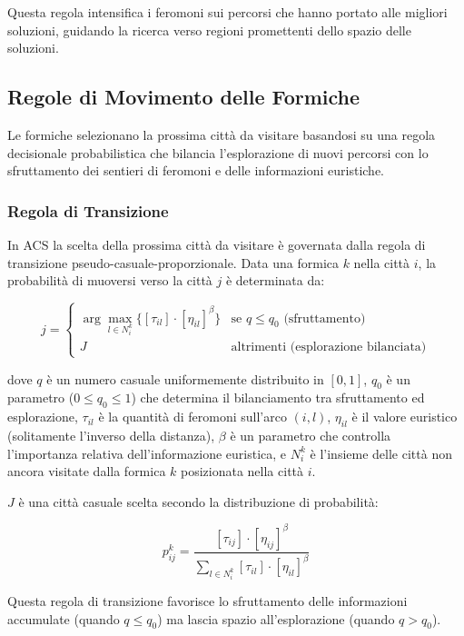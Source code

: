 Questa regola intensifica i feromoni sui percorsi che hanno portato alle migliori soluzioni, guidando la ricerca verso regioni promettenti dello spazio delle soluzioni.

\subsection{Regole di Movimento delle Formiche}

Le formiche selezionano la prossima città da visitare basandosi su una regola decisionale probabilistica che bilancia l'esplorazione di nuovi percorsi con lo sfruttamento dei sentieri di feromoni e delle informazioni euristiche.

\subsubsection{Regola di Transizione}
In \Gls{ACS} la scelta della prossima città da visitare è governata dalla regola di transizione pseudo-casuale-proporzionale. Data una formica $k$ nella città $i$, la probabilità di muoversi verso la città $j$ è determinata da:

\[
	j = \begin{cases}
		\arg\max_{l \in N_i^k} \{[\tau_{il}] \cdot [\eta_{il}]^\beta\} & \text{se }q \leq q_0 \text{ (sfruttamento)} \\
		J                                                              & \text{altrimenti (esplorazione bilanciata)}
	\end{cases}
\]

dove $q$ è un numero casuale uniformemente distribuito in $[0,1]$, $q_0$ è un parametro ($0 \le q_0 \le 1$) che determina il bilanciamento tra sfruttamento ed esplorazione, $\tau_{il}$ è la quantità di feromoni sull'arco $(i,l)$, $\eta_{il}$ è il valore euristico (solitamente l'inverso della distanza), $\beta$ è un parametro che controlla l'importanza relativa dell'informazione euristica, e $N_i^k$ è l'insieme delle città non ancora visitate dalla formica $k$ posizionata nella città $i$.

$J$ è una città casuale scelta secondo la distribuzione di probabilità:

\[
	p_{ij}^k = \frac{[\tau_{ij}] \cdot [\eta_{ij}]^\beta}{\sum_{l \in N_i^k} [\tau_{il}] \cdot [\eta_{il}]^\beta}
\]

Questa regola di transizione favorisce lo sfruttamento delle informazioni accumulate (quando $q \leq q_0$) ma lascia spazio all'esplorazione (quando $q > q_0$).


